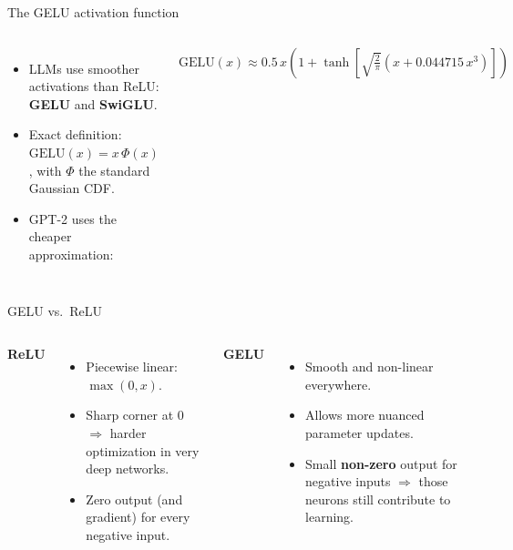 \documentclass[aspectratio=169]{beamer}
\begin{document}
	\begin{frame}{The GELU activation function}
		\begin{columns}[c]
			\small
			\begin{itemize}
				\item LLMs use smoother activations than ReLU: \textbf{GELU} and \textbf{SwiGLU}.
				\item Exact definition: $\text{GELU}(x) = x\,\Phi(x)$, with $\Phi$ the standard Gaussian CDF.
				\item GPT-2 uses the cheaper approximation:
			\end{itemize}
			\scriptsize
			\begin{equation*}
				\text{GELU}(x) \approx 0.5\,x\left(1 + \tanh\!\left[\sqrt{\tfrac{2}{\pi}}\left(x + 0.044715\,x^3\right)\right]\right)
			\end{equation*}
			\centering
		\end{columns}
	\end{frame}
	
	\begin{frame}{GELU vs.\ ReLU}
		\begin{columns}[T]
			\textbf{ReLU}
			\begin{itemize}
				\item Piecewise linear: $\max(0,x)$.
				\item Sharp corner at 0 $\Rightarrow$ harder optimization in very deep networks.
				\item Zero output (and gradient) for every negative input.
			\end{itemize}
			\textbf{GELU}
			\begin{itemize}
				\item Smooth and non-linear everywhere.
				\item Allows more nuanced parameter updates.
				\item Small \textbf{non-zero} output for negative inputs $\Rightarrow$ those neurons still contribute to learning.
			\end{itemize}
		\end{columns}
	\end{frame}
	
\end{document}
